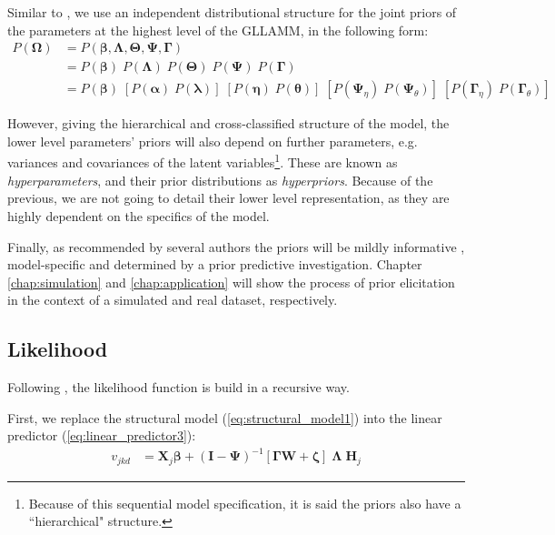 Similar to \citet{Patz_et_al_1999}, we use an independent distributional structure for the joint priors of the parameters at the highest level of the GLLAMM, in the following form:
%
\begin{equation} \label{eq:priors}
	\begin{split}
		P( \pmb{\Omega} ) & = P( \pmb{\beta}, \pmb{\Lambda}, \pmb{\Theta}, \pmb{\Psi}, \pmb{\Gamma} ) \\
		&= P( \pmb{\beta} ) \; P( \pmb{\Lambda} ) \; P( \pmb{\Theta} ) \; P( \pmb{\Psi} ) \; P( \pmb{\Gamma} ) \\
		&= P( \pmb{\beta} ) \; \left[ P( \pmb{\alpha} ) \; P( \pmb{\lambda} ) \right] \; \left[ P( \pmb{\eta} ) \; P( \pmb{\theta} ) \right] \; \left[ P( \pmb{\Psi}_{\eta} ) \; P( \pmb{\Psi}_{\theta} ) \right] \; \left[ P( \pmb{\Gamma}_{\eta} ) \; P( \pmb{\Gamma}_{\theta} ) \right]
	\end{split}
\end{equation}

\noindent However, giving the hierarchical and cross-classified structure of the model, the lower level parameters' priors will also depend on further parameters, e.g. variances and covariances of the latent variables\footnote{Because of this sequential model specification, it is said the priors also have a ``hierarchical" structure.}. These are known as \textit{hyperparameters}, and their prior distributions as \textit{hyperpriors}. Because of the previous, we are not going to detail their lower level representation, as they are highly dependent on the specifics of the model.

Finally, as recommended by several authors the priors will be mildly informative \cite{McElreath_2020, Fujimoto_2020, Tarazona_2013, Jiao_et_al_2012, Azevedo_2003, Wollack_2002}, model-specific and determined by a prior predictive investigation. Chapter \ref{chap:simulation} and \ref{chap:application} will show the process of prior elicitation in the context of a simulated and real dataset, respectively.


\subsection{Likelihood}

Following \citet{Rabe_et_al_2004a}, the likelihood function is build in a recursive way. 

\noindent First, we replace the structural model (\ref{eq:structural_model1}) into the linear predictor (\ref{eq:linear_predictor3}):
%
\begin{equation} \label{eq:lin_pred}
	\begin{split}
		v_{jkd} &= \mathbf{X}_{j} \pmb{\beta} + ( \mathbf{I} - \pmb{\Psi} )^{-1} \left[ \pmb{\Gamma} \mathbf{W} + \pmb{\zeta} \right] \; \pmb{\Lambda} \; \mathbf{H}_{j}
	\end{split}
\end{equation}

